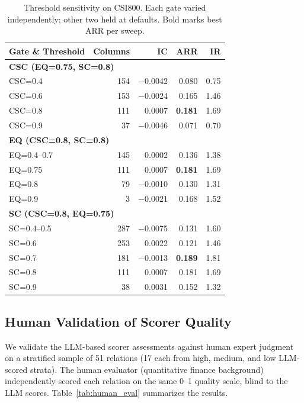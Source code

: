 \documentclass[sigconf]{acmart}
\begin{document}
\begin{table}[t]
\caption{Threshold sensitivity on CSI800. Each gate varied independently; other two held at defaults. Bold marks best ARR per sweep.}
\label{tab:threshold_sweep}
\centering
\begin{tabular}{l r r r r}
\toprule
Gate \& Threshold & Columns & IC & ARR & IR \\
\midrule
\multicolumn{5}{l}{\textbf{CSC (EQ=0.75, SC=0.8)}} \\
\quad CSC=0.4 & 154 & $-$0.0042 & 0.080 & 0.75 \\
\quad CSC=0.6 & 153 & $-$0.0024 & 0.165 & 1.46 \\
\quad CSC=0.8 & 111 & 0.0007 & \textbf{0.181} & 1.69 \\
\quad CSC=0.9 & 37 & $-$0.0046 & 0.071 & 0.70 \\
\midrule
\multicolumn{5}{l}{\textbf{EQ (CSC=0.8, SC=0.8)}} \\
\quad EQ=0.4--0.7 & 145 & 0.0002 & 0.136 & 1.38 \\
\quad EQ=0.75 & 111 & 0.0007 & \textbf{0.181} & 1.69 \\
\quad EQ=0.8 & 79 & $-$0.0010 & 0.130 & 1.31 \\
\quad EQ=0.9 & 3 & $-$0.0021 & 0.168 & 1.52 \\
\midrule
\multicolumn{5}{l}{\textbf{SC (CSC=0.8, EQ=0.75)}} \\
\quad SC=0.4--0.5 & 287 & $-$0.0075 & 0.131 & 1.60 \\
\quad SC=0.6 & 253 & 0.0022 & 0.121 & 1.46 \\
\quad SC=0.7 & 181 & $-$0.0013 & \textbf{0.189} & 1.81 \\
\quad SC=0.8 & 111 & 0.0007 & 0.181 & 1.69 \\
\quad SC=0.9 & 38 & 0.0031 & 0.152 & 1.32 \\
\bottomrule
\end{tabular}
\end{table}

\subsection{Human Validation of Scorer Quality}

We validate the LLM-based scorer assessments against human expert judgment on a stratified sample of 51 relations (17 each from high, medium, and low LLM-scored strata). The human evaluator (quantitative finance background) independently scored each relation on the same 0--1 quality scale, blind to the LLM scores. Table~\ref{tab:human_eval} summarizes the results.
\end{document}
